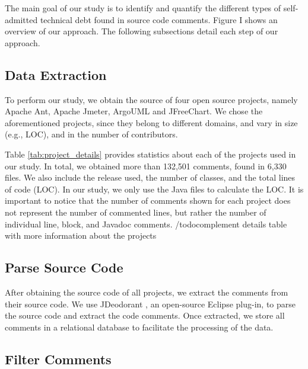 
The main goal of our study is to identify and quantify the different types of self-admitted technical debt found in source code comments. Figure I shows an overview of our approach. The following subsections detail each step of our approach.

\subsection{Data Extraction} %
\label{sub:data_extraction}

To perform our study, we obtain the source of four open source projects, namely Apache Ant, Apache Jmeter, ArgoUML and JFreeChart. We chose the aforementioned projects, since they belong to different domains, and vary in size (e.g., LOC), and in the number of contributors.

Table \ref{tab:project_details} provides statistics about each of the projects used in our study. In total, we obtained more than 132,501 comments, found in 6,330 files. We also include the release used, the number of classes, and the total lines of code (LOC). In our study, we only use the Java files to calculate the LOC. It is important to notice that the number of comments shown for each project does not represent the number of commented lines, but rather the number of individual line, block, and Javadoc comments.
/todo{complement details table with more information about the projects}
 
\subsection{Parse Source Code} %
\label{sub:parse_source_code}
After obtaining the source code of all projects, we extract the comments from their source code. We use JDeodorant \cite{Tsantalis2008CSMR}, an open-source Eclipse plug-in, to parse the source code and extract the code comments. Once extracted, we store all comments in a relational database to facilitate the processing of the data.

\subsection{Filter Comments} %
\label{sub:filter_comments}

